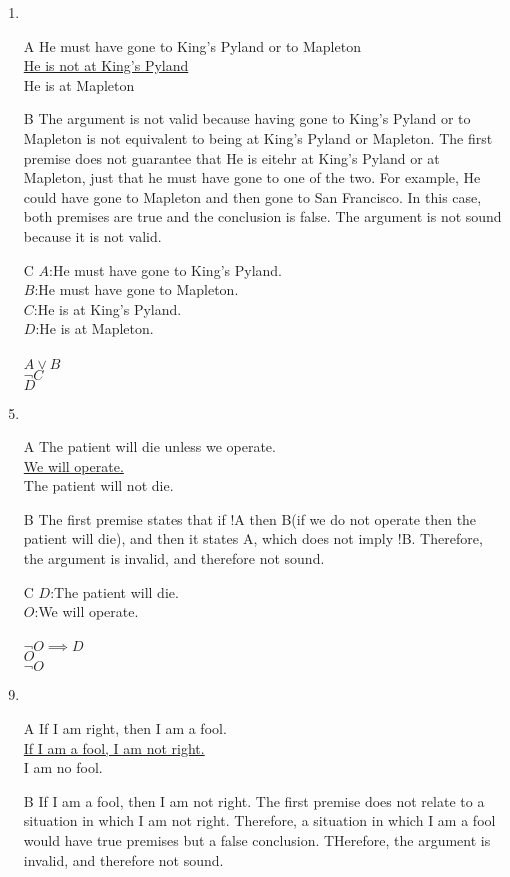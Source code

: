 \documentclass{article}
\begin{document}
\begin{enumerate}
\item
\item[A]
He must have gone to King's Pyland or to Mapleton
\\\underline{He is not at King's Pyland}
\\He is at Mapleton
\item[B]
The argument is not valid because having gone to King's Pyland or to Mapleton is not equivalent to being at King's Pyland or Mapleton. The first premise does not guarantee that He is eitehr at King's Pyland or at Mapleton, just that he must have gone to one of the two. For example, He could have gone to Mapleton and then gone to San Francisco. In this case, both premises are true and the conclusion is false. The argument is not sound because it is not valid.
\item[C]
$A$:He must have gone to King's Pyland.\\
$B$:He must have gone to Mapleton.\\
$C$:He is at King's Pyland.\\
$D$:He is at Mapleton.\\
\\
$A \lor B$\\
\underline{$\lnot C$}\\
$D$
\item
\item[A]
The patient will die unless we operate.
\\\underline{We will operate.}
\\The patient will not die.
\item[B]
The first premise states that if !A then B(if we do not operate then the patient will die), and then it states A, which does not imply !B. Therefore, the argument is invalid, and therefore not sound. 
\item[C]
$D$:The patient will die.\\
$O$:We will operate.\\
\\
$\lnot O \implies D$\\
\underline{$O$}\\
$\lnot O$
\item
\item[A]
If I am right, then I am a fool.
\\\underline{If I am a fool, I am not right.} 
\\I am no fool.
\item[B]
If I am a fool, then I am not right. The first premise does not relate to a situation in which I am not right. Therefore, a situation in which I am a fool would have true premises but a false conclusion. THerefore, the argument is invalid, and therefore not sound.

\end{enumerate}
\end{document}
